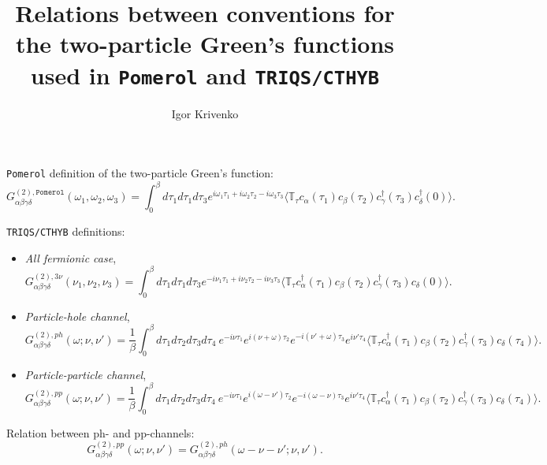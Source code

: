 \documentclass[a4paper,12pt]{article}
\newcommand{\aver}[1]{\ensuremath{\langle#1\rangle}}
\renewcommand{\t}{\ensuremath{\tau}}
\newcommand{\w}{\ensuremath{\omega}}
\newcommand{\n}{\ensuremath{\nu}}
\newcommand{\TT}{\ensuremath{\mathbb{T}_\t}}
\newcommand{\pom}{\ensuremath{\mathtt{Pomerol}}}
\begin{document}
\title{Relations between conventions for the two-particle Green's functions
       used in \texttt{Pomerol} and \texttt{TRIQS/CTHYB}}
\author{Igor Krivenko}
\maketitle

\texttt{Pomerol} definition of the two-particle Green's function:
\begin{equation}\label{g2_pomerol}
	G^{(2),\pom}_{\alpha\beta\gamma\delta}(\w_1,\w_2,\w_3) =
	   \int_0^\beta d\t_1d\t_1d\t_3
		e^{i\w_1\t_1 + i\w_2\t_2 - i\w_3\t_3}
		\aver{\TT
		c_\alpha(\t_1)c_\beta(\t_2)c^\dag_\gamma(\t_3)c^\dag_\delta(0)}.
\end{equation}

\texttt{TRIQS/CTHYB} definitions:
\begin{itemize}
	\item \textit{All fermionic case},
          \begin{equation}\label{g2_allfermionic}
	    G^{(2),3\nu}_{\alpha\beta\gamma\delta}(\nu_1,\nu_2,\nu_3) =
	    \int_0^\beta d\t_1d\t_1d\t_3
	    e^{-i\nu_1\t_1 + i\nu_2\t_2 - i\nu_3\t_3}
	    \aver{\TT
	      c^\dagger_\alpha(\t_1)c_\beta(\t_2)c^\dagger_\gamma(\t_3)c_\delta(0)}.
          \end{equation}
	\item \textit{Particle-hole channel},
		\begin{equation}\label{g2_ph}
			G^{(2),ph}_{\alpha\beta\gamma\delta}(\w;\n,\n') =
			\frac{1}{\beta}\int_0^\beta d\t_1d\t_2d\t_3d\t_4\
			e^{-i\n\t_1} e^{i(\n+\w)\tau_2} e^{-i(\n'+\w)\t_3} e^{i\n'\t_4}
			\aver{\TT
			c^\dag_\alpha(\t_1) c_\beta(\t_2) c^\dag_\gamma(\t_3)
			c_\delta(\t_4)}.
	\end{equation}

	\item \textit{Particle-particle channel},
		\begin{equation}\label{g2_pp}
			G^{(2),pp}_{\alpha\beta\gamma\delta}(\w;\n,\n') =
			\frac{1}{\beta}\int_0^\beta d\t_1d\t_2d\t_3d\t_4\
			e^{-i\n\t_1} e^{i(\w-\n')\t_2} e^{-i(\w-\n)\t_3} e^{i\n'\t_4}
			\aver{\TT
			c^\dag_\alpha(\t_1) c_\beta(\t_2) c^\dag_\gamma(\t_3)
			c_\delta(\t_4)}.
		\end{equation}
\end{itemize}

Relation between ph- and pp-channels:
\begin{equation}
	G^{(2),pp}_{\alpha\beta\gamma\delta}(\w;\n,\n') =
	G^{(2),ph}_{\alpha\beta\gamma\delta}(\w-\n-\n';\n,\n').
\end{equation}
\end{document}
